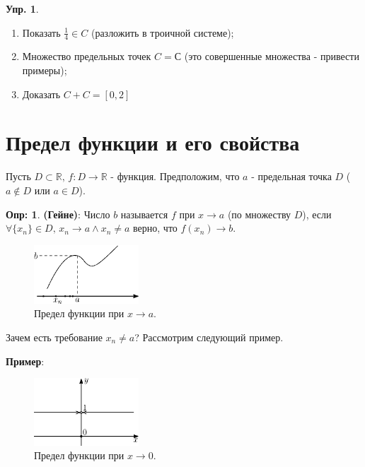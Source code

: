 \documentclass[12pt]{article}
\theoremstyle{definition}
\newtheorem{defn}{Опр:}
\newtheorem{exrc}{Упр.}
\begin{document}
\begin{exrc}\hfill
	\begin{enumerate}[label={\arabic*)}]
		\item Показать $\frac{1}{4} \in C$ (разложить в троичной системе);
		\item Множество предельных точек $C = С$ (это совершенные множества - привести примеры);
		\item Доказать $C + C = [0,2]$
	\end{enumerate}
\end{exrc}
\newpage

\section*{Предел функции и его свойства}

Пусть $D \subset \mathbb{R}, \, f \colon D \to \mathbb{R}$ - функция. Предположим, что $a$ - предельная точка $D$ ($a\notin D$ или $a \in D$).

\begin{defn}\textbf{(Гейне)}:
	Число $b$ называется  $f$ при $x \to a$ (по множеству $D$), если\\ 
	$\forall \{x_n\} \in D, \, x_n \to a \wedge x_n \neq a$ верно, что $f(x_n) \to b$.
\end{defn}

\begin{figure}[H]
	\centering
	\includegraphics[width=0.35\textwidth]{14_6.eps}
	\caption{Предел функции при $x \to a$.}
	\label{14_6}
\end{figure}


Зачем есть требование $x_n \neq a$? Рассмотрим следующий пример.

\textbf{Пример}: 

\begin{figure}[H]
	\centering
	\includegraphics[width=0.35\textwidth]{14_7.eps}
	\caption{Предел функции при $x \to 0$.}
	\label{14_7}
\end{figure}
\end{document}
